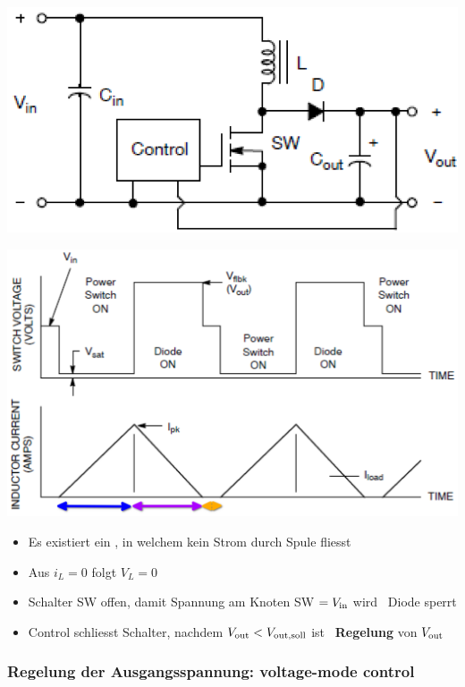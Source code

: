\begin{minipage}{0.42\columnwidth}
    \includegraphics[width=\columnwidth]{images/boost_lueckend.png}
\end{minipage}
\hfill
\begin{minipage}{0.5\columnwidth}
    \includegraphics[width=\columnwidth]{images/boost_lueckend_timing.png}
\end{minipage}

\begin{itemize}
    \item Es existiert ein , in welchem kein Strom durch Spule fliesst
    \item Aus $i_L = 0$ folgt $V_L = 0$
    \item Schalter SW offen, damit Spannung am Knoten SW $= V_{\rm in}$ wird \textrightarrow\ Diode sperrt
    \item Control schliesst Schalter, nachdem $V_{\rm out} < V_{\rm out,soll}$ ist \textrightarrow\ \textbf{Regelung} von $V_{\rm out}$
\end{itemize}


\subsubsection{Regelung der Ausgangsspannung: voltage-mode control}

